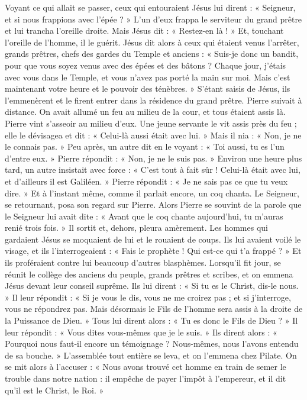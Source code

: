  Voyant ce qui allait se passer, ceux qui entouraient Jésus lui dirent : « Seigneur, et si nous frappions avec l’épée ? »
 L’un d’eux frappa le serviteur du grand prêtre et lui trancha l’oreille droite.
 Mais Jésus dit : « Restez-en là ! » Et, touchant l’oreille de l’homme, il le guérit.
 Jésus dit alors à ceux qui étaient venus l’arrêter, grands prêtres, chefs des gardes du Temple et anciens : « Suis-je donc un bandit, pour que vous soyez venus avec des épées et des bâtons ?
 Chaque jour, j’étais avec vous dans le Temple, et vous n’avez pas porté la main sur moi. Mais c’est maintenant votre heure et le pouvoir des ténèbres. »
 S’étant saisis de Jésus, ils l’emmenèrent et le firent entrer dans la résidence du grand prêtre. Pierre suivait à distance.
 On avait allumé un feu au milieu de la cour, et tous étaient assis là. Pierre vint s’asseoir au milieu d’eux.
 Une jeune servante le vit assis près du feu ; elle le dévisagea et dit : « Celui-là aussi était avec lui. »
 Mais il nia : « Non, je ne le connais pas. »
 Peu après, un autre dit en le voyant : « Toi aussi, tu es l’un d’entre eux. » Pierre répondit : « Non, je ne le suis pas. »
 Environ une heure plus tard, un autre insistait avec force : « C’est tout à fait sûr ! Celui-là était avec lui, et d’ailleurs il est Galiléen. »
 Pierre répondit : « Je ne sais pas ce que tu veux dire. » Et à l’instant même, comme il parlait encore, un coq chanta.
 Le Seigneur, se retournant, posa son regard sur Pierre. Alors Pierre se souvint de la parole que le Seigneur lui avait dite : « Avant que le coq chante aujourd’hui, tu m’auras renié trois fois. »
 Il sortit et, dehors, pleura amèrement.
 Les hommes qui gardaient Jésus se moquaient de lui et le rouaient de coups.
 Ils lui avaient voilé le visage, et ils l’interrogeaient : « Fais le prophète ! Qui est-ce qui t’a frappé ? »
 Et ils proféraient contre lui beaucoup d’autres blasphèmes.
 Lorsqu’il fit jour, se réunit le collège des anciens du peuple, grands prêtres et scribes, et on emmena Jésus devant leur conseil suprême.
 Ils lui dirent : « Si tu es le Christ, dis-le nous. » Il leur répondit : « Si je vous le dis, vous ne me croirez pas ;
 et si j’interroge, vous ne répondrez pas.
 Mais désormais le Fils de l’homme sera assis à la droite de la Puissance de Dieu. »
 Tous lui dirent alors : « Tu es donc le Fils de Dieu ? » Il leur répondit : « Vous dites vous-mêmes que je le suis. »
 Ils dirent alors : « Pourquoi nous faut-il encore un témoignage ? Nous-mêmes, nous l’avons entendu de sa bouche. »
 L’assemblée tout entière se leva, et on l’emmena chez Pilate.
 On se mit alors à l’accuser : « Nous avons trouvé cet homme en train de semer le trouble dans notre nation : il empêche de payer l’impôt à l’empereur, et il dit qu’il est le Christ, le Roi. »
